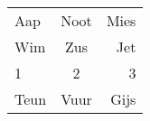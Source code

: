 \begin{tabular}{lcr}
  Aap  & Noot & Mies \\
  Wim  & Zus  & Jet  \\
  1    & 2    & 3    \\
  Teun & Vuur & Gijs \\
\end{tabular}
